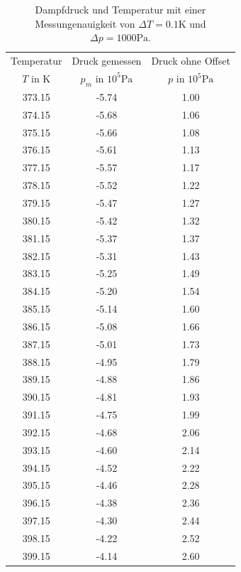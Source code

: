 \begin{table}
  \centering
  \begin{tabular}{c c c }
    \toprule
    Temperatur & Druck gemessen & Druck ohne Offset\\
    $T$ in $\si{\kelvin}$ & $p_m$ in $ 10^5\si{\pascal}$ &$p$ in $ 10^5\si{\pascal}$ \\
    \midrule
    373.15  &  -5.74  &  1.00  \\
    374.15  &  -5.68  &  1.06  \\
    375.15  &  -5.66  &  1.08  \\
    376.15  &  -5.61  &  1.13  \\
    377.15  &  -5.57  &  1.17  \\
    378.15  &  -5.52  &  1.22  \\
    379.15  &  -5.47  &  1.27  \\
    380.15  &  -5.42  &  1.32  \\
    381.15  &  -5.37  &  1.37  \\
    382.15  &  -5.31  &  1.43  \\
    383.15  &  -5.25  &  1.49  \\
    384.15  &  -5.20  &  1.54  \\
    385.15  &  -5.14  &  1.60  \\
    386.15  &  -5.08  &  1.66  \\
    387.15  &  -5.01  &  1.73  \\
    388.15  &  -4.95  &  1.79  \\
    389.15  &  -4.88  &  1.86  \\
    390.15  &  -4.81  &  1.93  \\
    391.15  &  -4.75  &  1.99  \\
    392.15  &  -4.68  &  2.06  \\
    393.15  &  -4.60  &  2.14  \\
    394.15  &  -4.52  &  2.22  \\
    395.15  &  -4.46  &  2.28  \\
    396.15  &  -4.38  &  2.36  \\
    397.15  &  -4.30  &  2.44  \\
    398.15  &  -4.22  &  2.52  \\
    399.15  &  -4.14  &  2.60  \\
    \bottomrule
  \end{tabular}
  \caption{Dampfdruck und Temperatur mit einer Messungenauigkeit von
  $\Delta T=0.1\si{\kelvin}$ und $\Delta p=1000 \si{\pascal}$.}
  \label{tab:messung2}
\end{table}
